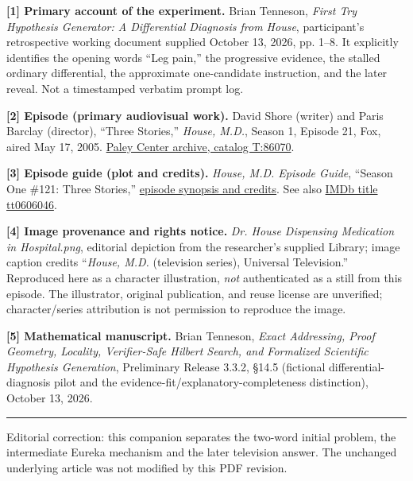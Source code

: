 \documentclass[11pt,letterpaper]{article}
\newcommand{\hsec}[1]{\vspace{4pt}{\large\bfseries\color{ink}#1}\par\vspace{2pt}{\textcolor{teal}{\rule{.44in}{1.25pt}}}\par\vspace{2pt}}
\newcommand{\thin}{{\color{line}\rule{\linewidth}{.4pt}}}
\begin{document}
\hsec{Episode, experiment and figure citations}
{\fontsize{8.5}{11.0}\selectfont\color{muted}
\textbf{[1] Primary account of the experiment.} Brian Tenneson, \emph{First Try Hypothesis Generator: A Differential Diagnosis from House}, participant's retrospective working document supplied October 13, 2026, pp. 1--8. It explicitly identifies the opening words ``Leg pain,'' the progressive evidence, the stalled ordinary differential, the approximate one-candidate instruction, and the later reveal. Not a timestamped verbatim prompt log.

\textbf{[2] Episode (primary audiovisual work).} David Shore (writer) and Paris Barclay (director), ``Three Stories,'' \emph{House, M.D.}, Season 1, Episode 21, Fox, aired May 17, 2005. \href{https://www.paleycenter.org/collection/item/?item=T%3A86070}{Paley Center archive, catalog T:86070}.

\textbf{[3] Episode guide (plot and credits).} \emph{House, M.D. Episode Guide}, ``Season One \#121: Three Stories,'' \href{https://www.housemd-guide.com/season1/121stories.php}{episode synopsis and credits}. See also \href{https://www.imdb.com/title/tt0606046/}{IMDb title tt0606046}.

\textbf{[4] Image provenance and rights notice.} \emph{Dr. House Dispensing Medication in Hospital.png}, editorial depiction from the researcher's supplied Library; image caption credits ``\emph{House, M.D.} (television series), Universal Television.'' Reproduced here as a character illustration, \emph{not} authenticated as a still from this episode. The illustrator, original publication, and reuse license are unverified; character/series attribution is not permission to reproduce the image.

\textbf{[5] Mathematical manuscript.} Brian Tenneson, \emph{Exact Addressing, Proof Geometry, Locality, Verifier-Safe Hilbert Search, and Formalized Scientific Hypothesis Generation}, Preliminary Release 3.3.2, \S14.5 (fictional differential-diagnosis pilot and the evidence-fit/explanatory-completeness distinction), October 13, 2026.
}
\vfill
\thin\par\vspace{3pt}
{\fontsize{8.8}{11}\selectfont\color{muted}Editorial correction: this companion separates the two-word initial problem, the intermediate Eureka mechanism and the later television answer. The unchanged underlying article was not modified by this PDF revision.}
\end{document}
